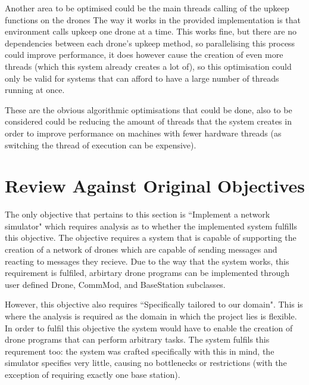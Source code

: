 	Another area to be optimised could be the main threads calling of the upkeep functions on the drones The way it works
	in the provided implementation is that environment calls upkeep one drone at a time. This works fine, but there are no dependencies
	between each drone's upkeep method, so parallelising this process could improve performance, it does however cause the 
	creation of even more threads (which this system already creates a lot of), so this optimisation could only be valid for
	systems that can afford to have a large number of threads running at once.

	These are the obvious algorithmic optimisations that could be done, also to be considered could be reducing the amount of threads
	that the system creates in order to improve performance on machines with fewer hardware threads (as switching the thread
	of execution can be expensive).

\section{Review Against Original Objectives}
	The only objective that pertains to this section is ``Implement a network simulator" which requires analysis as to whether
	the implemented system fulfills this objective. The objective requires a system that is capable of supporting the creation 
	of a network of drones which are capable of sending messages and reacting to messages they recieve. Due to the way that the
	system works, this requirement is fulfiled, arbirtary drone programs can be implemented through user defined Drone, CommMod, and
	BaseStation subclasses.

	However, this objective also requires ``Specifically tailored to our domain". This is where the analysis is required as
	the domain in which the project lies is flexible. In order to fulfil this objective the system would have to enable the
	creation of drone programs that can perform arbitrary tasks. The system fulfils this requrement too: the system was crafted
	specifically with this in mind, the simulator specifies very little, causing no bottlenecks or restrictions (with the exception
	of requiring exactly one base station).

